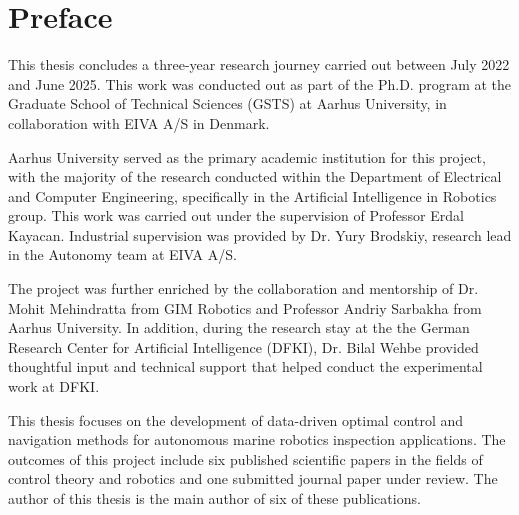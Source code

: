 

\chapter*{Preface}
This thesis concludes a three-year research journey carried out between July 2022 and June 2025. This work was conducted out as part of the Ph.D. program at the Graduate School of Technical Sciences (GSTS) at Aarhus University, in collaboration with EIVA A/S in Denmark. 

Aarhus University served as the primary academic institution for this project, with the majority of the research conducted within the Department of Electrical and Computer Engineering, specifically in the Artificial Intelligence in Robotics group. This work was carried out under the supervision of Professor Erdal Kayacan. Industrial supervision was provided by Dr. Yury Brodskiy, research lead in the Autonomy team at EIVA A/S. 

The project was further enriched by the collaboration and mentorship of Dr. Mohit Mehindratta from GIM Robotics and Professor Andriy Sarbakha from Aarhus University. In addition, during the research stay at the the German Research Center for Artificial Intelligence (DFKI), Dr. Bilal Wehbe provided thoughtful input and technical support that helped conduct the experimental work at DFKI.

This thesis focuses on the development of data-driven optimal control and navigation methods for autonomous marine robotics inspection applications. The outcomes of this project include six published scientific papers in the fields of control theory and robotics and one submitted journal paper under review. The author of this thesis is the main author of six of these publications.



